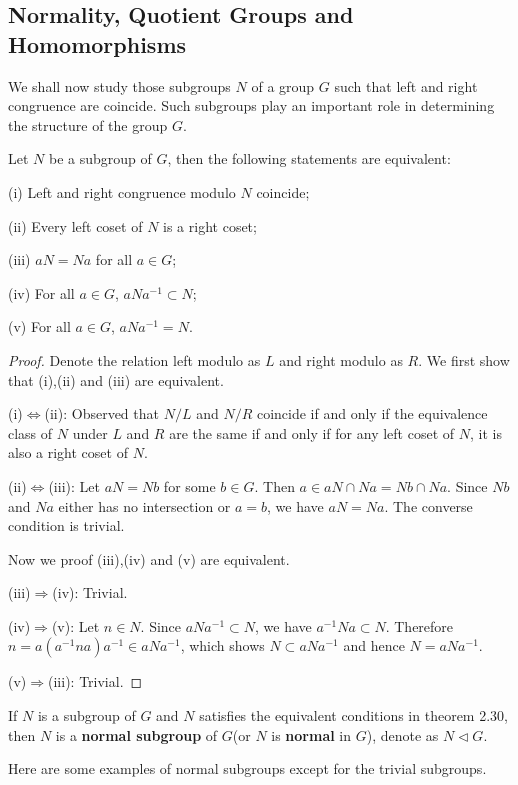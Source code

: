 \subsection{Normality, Quotient Groups and Homomorphisms}
We shall now study those subgroups $N$ of a group $G$ such that left and right congruence are coincide. Such subgroups play an important role in determining the structure of the group $G$.
\begin{theorem}
Let $N$ be a subgroup of $G$, then the following statements are equivalent:\par
(i) Left and right congruence modulo $N$ coincide;\par
(ii) Every left coset of $N$ is a right coset;\par
(iii) $aN=Na$ for all $a\in G$;\par
(iv) For all $a\in G$, $aNa^{-1}\subset N$;\par
(v) For all $a\in G$, $aNa^{-1}=N$.
\end{theorem}
\begin{proof}
Denote the relation left modulo as $L$ and right modulo as $R$. We first show that (i),(ii) and (iii) are equivalent.\par
(i)$\Leftrightarrow$(ii): Observed that $N/L$ and $N/R$ coincide if and only if the equivalence class of $N$ under $L$ and $R$ are the same if and only if for any left coset of $N$, it is also a right coset of $N$.\par
(ii)$\Leftrightarrow$(iii): Let $aN=Nb$ for some $b\in G$. Then $a\in aN\cap Na=Nb\cap Na$. Since $Nb$ and $Na$ either has no intersection or $a=b$, we have $aN=Na$. The converse condition is trivial.\par
Now we proof (iii),(iv) and (v) are equivalent.\par
(iii)$\Rightarrow$(iv): Trivial.\par
(iv)$\Rightarrow$(v): Let $n\in N$. Since $aNa^{-1}\subset N$, we have $a^{-1}Na\subset N$. Therefore $n=a(a^{-1}na)a^{-1}\in aNa^{-1}$, which shows $N\subset aNa^{-1}$ and hence $N=aNa^{-1}$.\par
(v)$\Rightarrow$(iii): Trivial.
\end{proof}
\begin{definition}
If $N$ is a subgroup of $G$ and $N$ satisfies the equivalent conditions in theorem 2.30, then $N$ is a \textbf{normal subgroup} of $G$(or $N$ is \textbf{normal} in $G$), denote as $N\lhd G$.
\end{definition}
Here are some examples of normal subgroups except for the trivial subgroups.
